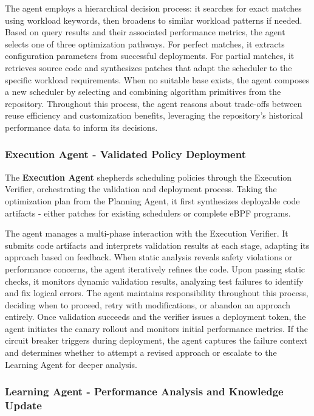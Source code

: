 The agent employs a hierarchical decision process: it searches for exact matches using workload keywords, then broadens to similar workload patterns if needed. Based on query results and their associated performance metrics, the agent selects one of three optimization pathways. For perfect matches, it extracts configuration parameters from successful deployments. For partial matches, it retrieves source code and synthesizes patches that adapt the scheduler to the specific workload requirements. When no suitable base exists, the agent composes a new scheduler by selecting and combining algorithm primitives from the repository. Throughout this process, the agent reasons about trade-offs between reuse efficiency and customization benefits, leveraging the repository's historical performance data to inform its decisions.

\subsubsection{Execution Agent - Validated Policy Deployment}

The \textbf{Execution Agent} shepherds scheduling policies through the Execution Verifier, orchestrating the validation and deployment process. Taking the optimization plan from the Planning Agent, it first synthesizes deployable code artifacts - either patches for existing schedulers or complete eBPF programs.

The agent manages a multi-phase interaction with the Execution Verifier. It submits code artifacts and interprets validation results at each stage, adapting its approach based on feedback. When static analysis reveals safety violations or performance concerns, the agent iteratively refines the code. Upon passing static checks, it monitors dynamic validation results, analyzing test failures to identify and fix logical errors. The agent maintains responsibility throughout this process, deciding when to proceed, retry with modifications, or abandon an approach entirely. Once validation succeeds and the verifier issues a deployment token, the agent initiates the canary rollout and monitors initial performance metrics. If the circuit breaker triggers during deployment, the agent captures the failure context and determines whether to attempt a revised approach or escalate to the Learning Agent for deeper analysis.

\subsubsection{Learning Agent - Performance Analysis and Knowledge Update}

